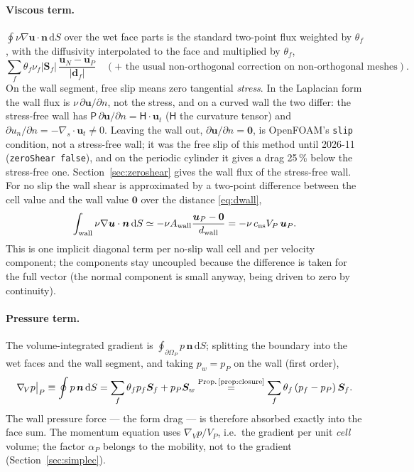 \documentclass[11pt,a4paper]{article}
\theoremstyle{remark}
\newcommand{\uu}{\bm{u}}
\newcommand{\nn}{\bm{n}}
\newcommand{\Sf}{\bm{S}_f}
\newcommand{\Sw}{\bm{S}_w}
\newcommand{\dd}{\,\mathrm{d}}
\newcommand{\Aw}{A_{\rm wall}}
\newcommand{\dw}{d_{\rm wall}}
\newcommand{\cns}{c_{\rm ns}}
\newcommand{\code}[1]{\texttt{#1}}
\newcommand{\gradV}{\nabla_{\!V}}
\begin{document}
\paragraph{Viscous term.} $\oint\nu\nabla\uu\cdot\nn\dd S$ over the wet face parts is the
standard two-point flux weighted by $\theta_f$, with the diffusivity interpolated to the face
and multiplied by $\theta_f$,
\begin{equation}
\sum_f\theta_f\nu_f|\Sf|\,\frac{\uu_N-\uu_P}{|\bm d_f|}\quad
(+\text{ the usual non-orthogonal correction on non-orthogonal meshes}).
\label{eq:viscface}
\end{equation}
On the wall segment, free slip means zero tangential \emph{stress}. In the Laplacian form the wall
flux is $\nu\,\partial\uu/\partial n$, not the stress, and on a curved wall the two differ:
the stress-free wall has $\mathsf P\,\partial\uu/\partial n=\mathsf H\cdot\uu_t$ ($\mathsf H$ the
curvature tensor) and $\partial u_n/\partial n=-\nabla_{\!s}\cdot\uu_t\ne0$. Leaving the wall out,
$\partial\uu/\partial n=\bm 0$, is OpenFOAM's \code{slip} condition, not a stress-free wall; it was the
free slip of this method until 2026-11 (\code{zeroShear false}), and on the periodic cylinder it
gives a drag 25\,\% below the stress-free one. Section~\ref{sec:zeroshear} gives the wall flux of the
stress-free wall. For no slip the wall shear is
approximated by a two-point difference between the cell value and the wall value $\bm 0$ over
the distance \eqref{eq:dwall},
\begin{equation}
\int_{\rm wall}\nu\nabla\uu\cdot\nn\dd S\simeq-\nu\Aw\frac{\uu_P-\bm 0}{\dw}
=-\nu\,\cns V_P\,\uu_P .
\label{eq:noslipwall}
\end{equation}
This is one implicit diagonal term per no-slip wall cell and per velocity component; the
components stay uncoupled because the difference is taken for the full vector (the normal
component is small anyway, being driven to zero by continuity).

\paragraph{Pressure term.} The volume-integrated gradient is
$\oint_{\partial\Omega_P}p\,\nn\dd S$; splitting the boundary into the wet faces and the wall
segment, and taking $p_w=p_P$ on the wall (first order),
\begin{equation}
\gradV p\big|_P\equiv\oint p\,\nn\dd S=\sum_f\theta_fp_f\Sf+p_P\Sw
\overset{\text{Prop.\,\ref{prop:closure}}}{=}\sum_f\theta_f\,(p_f-p_P)\,\Sf .
\label{eq:grad}
\end{equation}
The wall pressure force --- the form drag --- is therefore absorbed exactly into the face sum.
The momentum equation uses $\gradV p/V_P$, i.e.\ the gradient per unit \emph{cell} volume;
the factor $\alpha_P$ belongs to the mobility, not to the gradient (Section~\ref{sec:simplec}).
\end{document}
